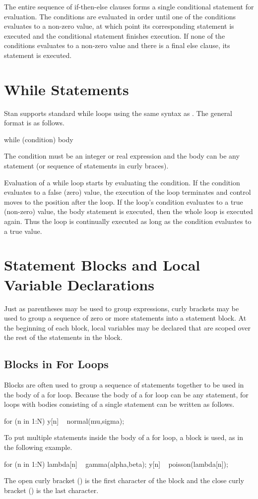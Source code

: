 The entire sequence of if-then-else clauses forms a single conditional
statement for evaluation.  The conditions are evaluated in order
until one of the conditions evaluates to a non-zero value, at which
point its corresponding statement is executed and the conditional
statement finishes execution.  If none of the conditions evaluates to
a non-zero value and there is a final else clause, its statement is
executed.

\section{While Statements}

Stan supports standard while loops using the same syntax as \Cpp.  The
general format is as follows.
%
\begin{stancode}
while (condition)
  body
\end{stancode}
%
The condition must be an integer or real expression and the body can
be any statement (or sequence of statements in curly braces).

Evaluation of a while loop starts by evaluating the condition.  If the
condition evaluates to a false (zero) value, the execution of the loop
terminates and control moves to the position after the loop.  If the
loop's condition evaluates to a true (non-zero) value, the body statement is
executed, then the whole loop is executed again.  Thus the loop is
continually executed as long as the condition evaluates to a true value.


\section{Statement Blocks and Local Variable Declarations}

Just as parentheses may be used to group expressions, curly brackets
may be used to group a sequence of zero or more statements into a
statement block.  At the beginning of each block, local variables may be
declared that are scoped over the rest of the statements in the block.

\subsection{Blocks in For Loops}

Blocks are often used to group a sequence of statements together to be
used in the body of a for loop.  Because the body of a for loop can be
any statement, for loops with bodies consisting of a single statement
can be written as follows.
%
\begin{stancode}
for (n in 1:N)
  y[n] ~ normal(mu,sigma);
\end{stancode}
%
To put multiple statements inside the body of a for loop, a block is
used, as in the following example.
%
\begin{stancode}
for (n in 1:N) {
  lambda[n] ~ gamma(alpha,beta);
  y[n] ~ poisson(lambda[n]);
}
\end{stancode}
%
The open curly bracket (\code{\{}) is the first character of the block
and the close curly bracket (\code{\}}) is the last character.

